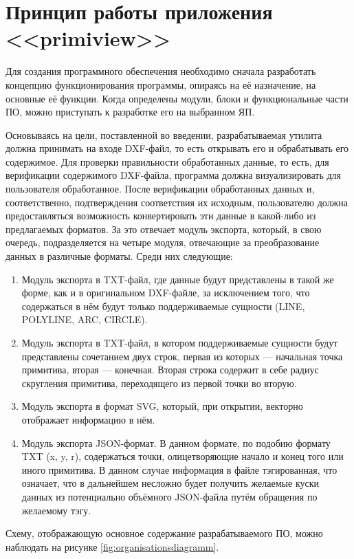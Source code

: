\section{Принцип работы приложения <<primiview>>}

Для создания программного обеспечения необходимо сначала разработать концепцию функционирования программы, опираясь на её назначение, на основные её функции. Когда определены модули, блоки и функциональные части ПО, можно приступать к разработке его на выбранном ЯП.

Основываясь на цели, поставленной во введении, разрабатываемая утилита должна принимать на входе DXF-файл, то есть открывать его и обрабатывать его содержимое. Для проверки правильности обработанных данные, то есть, для верификации содержимого DXF-файла, программа должна визуализировать для пользователя обработанное. После верификации обработанных данных и, соответственно, подтверждения соответствия их исходным, пользователю должна предоставляться возможность конвертировать эти данные в какой-либо из предлагаемых форматов. За это отвечает модуль экспорта, который, в свою очередь, подразделяется на четыре модуля, отвечающие за преобразование данных в различные форматы. Среди них следующие:

\begin{enumerate}
	\item Модуль экспорта в TXT-файл, где данные будут представлены в такой же форме, как и в оригинальном DXF-файле, за исключением того, что содержаться в нём будут только поддерживаемые сущности (LINE, POLYLINE, ARC, CIRCLE).
	\item Модуль экспорта в TXT-файл, в котором поддерживаемые сущности будут представлены сочетанием двух строк, первая из которых --- начальная точка примитива, вторая --- конечная. Вторая строка содержит в себе радиус скругления примитива, переходящего из первой точки во вторую.
	\item Модуль экспорта в формат SVG, который, при открытии, векторно отображает информацию в нём.
	\item Модуль экспорта JSON-формат. В данном формате, по подобию формату TXT (x, y, r), содержаться точки, олицетворяющие начало и конец того или иного примитива. В данном случае информация в файле тэгированная, что означает, что в дальнейшем несложно будет получить желаемые куски данных из потенциально объёмного JSON-файла путём обращения по желаемому тэгу.
\end{enumerate}


Схему, отображающую основное содержание разрабатываемого ПО, можно наблюдать на рисунке \ref{fig:organisationsdiagramm}.

